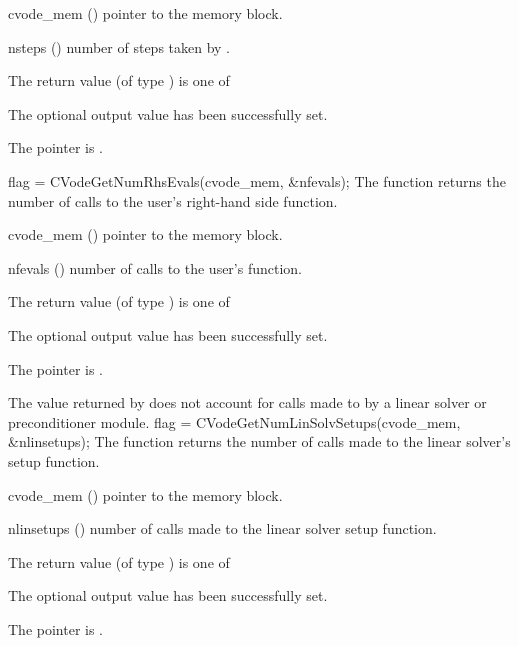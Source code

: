 {
  \begin{args}
  \item[cvode\_mem] ()
    pointer to the {\cvodes} memory block.
  \item[nsteps] ()
    number of steps taken by {\cvodes}.
  \end{args}
}
{
  The return value  (of type ) is one of
  \begin{args}
  \item[\Id{CV\_SUCCESS}]
    The optional output value has been successfully set.
  \item[\Id{CV\_MEM\_NULL}]
    The  pointer is .
  \end{args}
}
{}
{
  flag = CVodeGetNumRhsEvals(cvode\_mem, \&nfevals);
}
{
  The function  returns the
  number of calls to the user's right-hand side function.
}
{
  \begin{args}
  \item[cvode\_mem] ()
    pointer to the {\cvodes} memory block.
  \item[nfevals] ()
    number of calls to the user's  function.
  \end{args}
}
{
  The return value  (of type ) is one of
  \begin{args}
  \item[\Id{CV\_SUCCESS}]
    The optional output value has been successfully set.
  \item[\Id{CV\_MEM\_NULL}]
    The  pointer is .
  \end{args}
}
{
  The  value returned by  does not
  account for calls made to  by a linear solver or preconditioner
  module.
}
{
  flag = CVodeGetNumLinSolvSetups(cvode\_mem, \&nlinsetups);
}
{
  The function  returns the
  number of calls made to the linear solver's setup function.
}
{
  \begin{args}[nlinsetups]
  \item[cvode\_mem] ()
    pointer to the {\cvodes} memory block.
  \item[nlinsetups] ()
    number of calls made to the linear solver setup function.
  \end{args}
}
{
  The return value  (of type ) is one of
  \begin{args}
  \item[\Id{CV\_SUCCESS}]
    The optional output value has been successfully set.
  \item[\Id{CV\_MEM\_NULL}]
    The  pointer is .
  \end{args}
}
